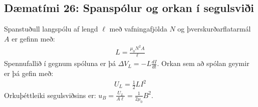 \ifdefined \wholebook \else\documentclass[oneside]{book}\usepackage{EdlBook}\graphicspath{{figures/}}
\begin{document}
\newpage


\subsection*{Dæmatími 26: Spanspólur og orkan í segulsviði}

\begin{tcolorbox}
Spanstuðull langspólu af lengd $\ell$ með vafningafjölda $N$ og þverskurðarflatarmál $A$ er gefinn með:
\begin{align*}
    L = \frac{\mu_0 N^2 A}{\ell}
\end{align*}
Spennufallið í gegnum spóluna er þá $\Delta V_L = - L \frac{dI}{dt}$. Orkan sem að spólan geymir er þá gefin með:
\begin{align*}
    U_L = \frac{1}{2}LI^2
\end{align*}
Orkuþéttleiki segulsviðsins er: $u_B = \frac{U_L}{A\ell} = \frac{1}{2\mu_0}B^2$.
\end{tcolorbox}
\end{document}
